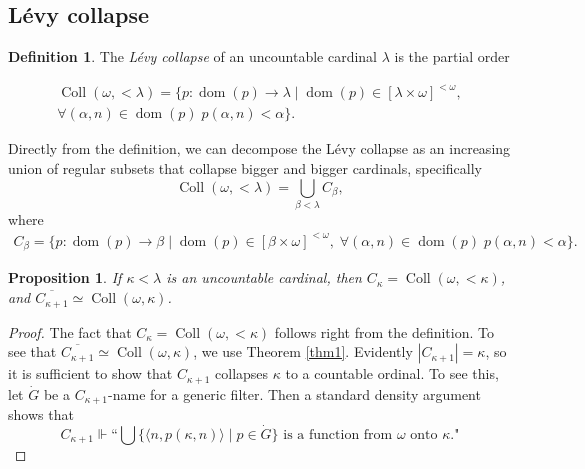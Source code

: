 \documentclass[11pt]{amsart}
\newtheorem{prop}[thm]{Proposition}
\theoremstyle{definition}
\newtheorem{defin}[thm]{Definition}
\newcommand{\dom}{\operatorname{dom}}
\newcommand{\col}{\operatorname{Coll}}
\newcommand{\colllambda}{\operatorname{Coll}(\omega,<\lambda)}
\begin{document}
\subsection{L\'evy collapse}


\begin{defin}
    The \emph{L\'evy collapse} of an uncountable cardinal $\lambda$ is the partial order

    \begin{align*} \colllambda=\{p:\dom(p)\longrightarrow \lambda\mid \dom(p) \in [\lambda \times \omega]^{<\omega},\\
    \forall (\alpha,n)\in\dom(p) \; p(\alpha,n)<\alpha\}.
    \end{align*}
\end{defin}

Directly from the definition, we can decompose the L\'evy collapse as an increasing union of regular subsets that collapse bigger and bigger cardinals, specifically
$$\colllambda=\bigcup_{\beta<\lambda} C_\beta,$$
where 
    \begin{align*} C_\beta=\{p:\dom(p)\longrightarrow \beta\mid            \dom(p) \in [\beta \times \omega]^{<\omega},\;
     \forall (\alpha,n)\in\dom(p) \; p(\alpha,n)<\alpha\}.
    \end{align*}

\begin{prop}\label{prop1}
    If $\kappa<\lambda$ is an uncountable cardinal, then $C_\kappa=\col(\omega,<\kappa)$, and $\overline{C_{\kappa+1}}\simeq \col(\omega,\kappa)$.
\end{prop}
\begin{proof}
    The fact that $C_\kappa=\col(\omega,<\kappa)$ follows right from the definition. To see that $\overline{C_{\kappa+1}}\simeq \col(\omega,\kappa)$, we use Theorem \ref{thm1}. Evidently $|C_{\kappa+1}|=\kappa$, so it is sufficient to show that $C_{\kappa+1}$ collapses $\kappa$ to a countable ordinal. To see this, let $\dot{G}$ be a $C_{\kappa+1}$-name for a generic filter. Then a standard density argument shows that
    $$C_{\kappa+1}\Vdash \text{``}\bigcup \{\langle n,p(\kappa,n)\rangle \mid p \in \dot{G}\}\text{ is a function from $\omega$ onto $\kappa$}.\text{"}$$
\end{proof}
\end{document}
